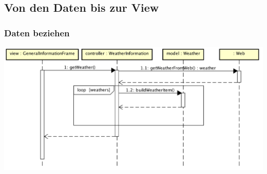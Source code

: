 \documentclass[11pt]{beamer}
\begin{document}
	\subsection{Von den Daten bis zur View}
	\begin{frame}
		\frametitle{Daten beziehen}
		\begin{center}
			\includegraphics[height=.55\paperheight]{images/sequenceDiagramGettingData}
		\end{center}
	\end{frame}
\end{document}
